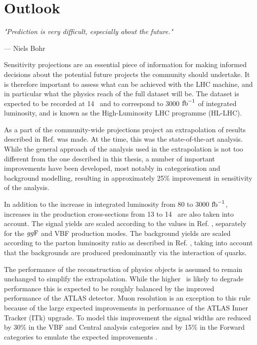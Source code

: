\chapter{Outlook}

\textit{"Prediction is very difficult, especially about the future."}

\vspace{5mm}
\begin{flushright}
--- Niels Bohr
\end{flushright}

\thispagestyle{empty}

\newpage

Sensitivity projections are an essential piece of information for
making informed decisions about the potential future projects the community
should undertake.
It is therefore important to assess what can be achieved with the LHC
machine, and in particular what the physics reach of the full dataset
will be. The dataset is expected to be recorded at 14 \TeV~and to
correspond to 3000 $\text{fb}^{-1}$ of integrated luminosity, and is known
as the High-Luminosity LHC programme (HL-LHC).

As a part of the community-wide projections project \cite{ATL-PHYS-PUB-2018-054, Cepeda:2019klc}
an extrapolation of results described in Ref. \cite{ATLAS-CONF-2018-026}
was made. At the time, this was the state-of-the-art analysis.
While the general approach of the analysis used in the extrapolation
is not too different from the one described in this thesis, a number
of important improvements have been developed, most notably in categorisation
and background modelling, resulting in approximately 25\% improvement
in sensitivity of the analysis.

In addition to the increase in integrated luminosity from 80 to 3000 $\text{fb}^{-1}$,
increases in the production cross-sections from 13 to 14 \TeV~are also
taken into account. The signal yields are scaled according to the
values in Ref. \cite{deFlorian:2016spz}, separately for the $gg\text{F}$
and VBF production modes. The background yields are scaled according
to the parton luminosity ratio as described in Ref. \cite{Heinemeyer:2013tqa},
taking into account that the backgrounds are produced predominantly via
the interaction of quarks.

The performance of the reconstruction of physics objects is assumed
to remain unchanged to simplify the extrapolation. While the higher
\pileup~is likely to degrade performance this is expected to be
roughly balanced by the improved performance of the ATLAS detector.
Muon resolution is an exception to this rule because of the
large expected improvements in performance of the ATLAS Inner Tracker (ITk)
upgrade. To model this improvement the signal widths are reduced 
by 30\% in the VBF and Central analysis categories and by 15\% in
the Forward categories to emulate the expected improvements
\cite{Collaboration:2285585}.

